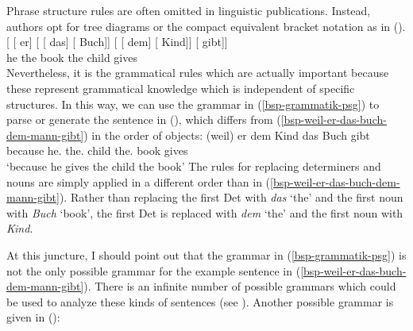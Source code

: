 Phrase structure rules are often omitted in linguistic publications. Instead, authors opt for tree diagrams or the compact equivalent bracket notation
as in ().
\ea
\gll {}[ [ er] [ [ das] [ Buch]]  [ [ dem] [ Kind]] [ gibt]]\\
     {}         {}        he  {}        {}       the  {}       book    {}        {}       the  {}       child     {}      gives\\  
\z
Nevertheless, it is the grammatical rules which are actually important because these represent grammatical knowledge which is independent of specific structures.
In this way, we can use the grammar in (\ref{bsp-grammatik-psg}) to parse or generate the sentence
in (), which differs from (\ref{bsp-weil-er-das-buch-dem-mann-gibt}) in the order of objects: 
\ea
\gll {}(weil) er dem Kind das Buch gibt\\
     {}\spacebr{}because he.\NOM{} the.\DAT{} child the.\ACC{} book gives\\
\glt `because he gives the child the book'
\z
The rules for replacing determiners and nouns are simply applied in a different order than in (\ref{bsp-weil-er-das-buch-dem-mann-gibt}). Rather than replacing the first Det with \emph{das} `the' and the first noun with \emph{Buch} `book', the first Det is replaced with \emph{dem} `the' and the first noun with \emph{Kind}.

At this juncture, I should point out that the grammar in (\ref{bsp-grammatik-psg}) is not the only possible grammar for the example sentence in
(\ref{bsp-weil-er-das-buch-dem-mann-gibt}). There is an infinite\label{page-unendlich-viele-grammatiken} number of possible grammars which could
be used to analyze these kinds of sentences (see \citealt[Chapter~2, exercise~1]{MuellerGT-Eng}). Another possible grammar is given in ():

